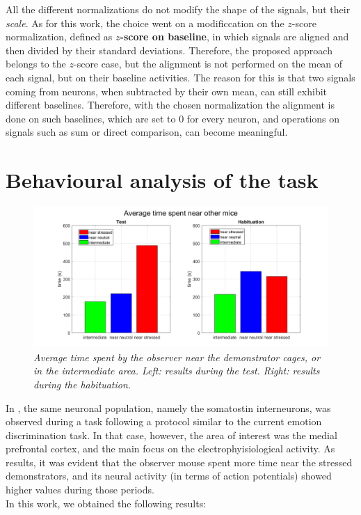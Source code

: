 \documentclass[12pt, a4paper]{report}
\begin{document}
All the different normalizations do not modify the shape of the signals, but their \textit{scale}. As for this work, the choice went on a modificcation on the $z$-score normalization, defined as \textbf{$z$-score on baseline}, in which signals are aligned and then divided by their standard deviations. Therefore, the proposed approach belongs to the $z$-score case, but the alignment is not performed on the mean of each signal, but on their baseline activities. The reason for this is that two signals coming from neurons, when subtracted by their own mean, can still exhibit different baselines. Therefore, with the chosen normalization the alignment is done on such baselines, which are set to $0$ for every neuron, and operations on signals such as sum or direct comparison, can become meaningful.



\section{Behavioural analysis of the task}


\begin{figure}[H]
	
	\centering
	
	\hspace*{-1 cm}
	\includegraphics[scale=.45]{times.png} 
	\caption{\textit{Average time spent by the observer near the demonstrator cages, or in the intermediate area. Left: results during the test. Right: results during the habituation. }} \label{times}
	
\end{figure}

In \cite{8}, the same neuronal population, namely the somatostin interneurons, was observed during a task following a protocol similar to the current emotion discrimination task. In that case, however, the area of interest was the medial prefrontal cortex, and the main focus on the electrophyisiological activity. As results, it was evident that the observer mouse spent more time near the stressed demonstrators, and its neural activity (in terms of action potentials) showed higher values during those periods.\\
In this work, we obtained the following results:
\end{document}
